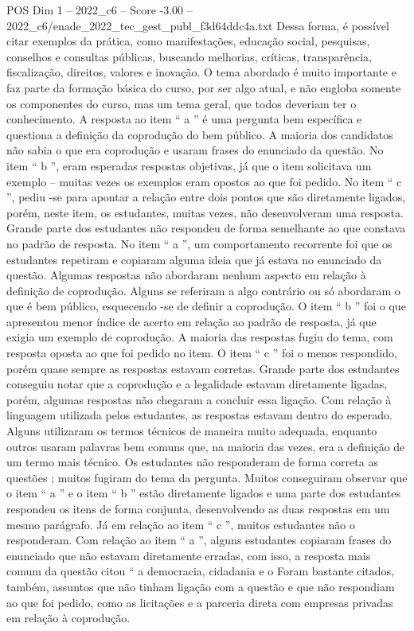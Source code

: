 \begin{textsample}{POS Dim 1 – 2022\_c6 – Score -3.00 – 2022\_c6/enade\_2022\_tec\_gest\_publ\_f3d64ddc4a.txt}
Dessa forma, é possível citar exemplos da prática, como manifestações, educação social, pesquisas, conselhos e consultas públicas, buscando melhorias, críticas, transparência, fiscalização, direitos, valores e inovação.
O tema abordado é muito importante e faz parte da formação básica do curso, por ser algo atual, e não engloba somente os componentes do curso, mas um tema geral, que todos deveriam ter o conhecimento.
A resposta ao item “ a ” é uma pergunta bem específica e questiona a definição da coprodução do bem público.
A maioria dos candidatos não sabia o que era coprodução e usaram frases do enunciado da questão.
No item “ b ”, eram esperadas respostas objetivas, já que o item solicitava um exemplo – muitas vezes os exemplos eram opostos ao que foi pedido.
No item “ c ”, pediu -se para apontar a relação entre dois pontos que são diretamente ligados, porém, neste item, os estudantes, muitas vezes, não desenvolveram uma resposta.
Grande parte dos estudantes não respondeu de forma semelhante ao que constava no padrão de resposta.
No item “ a ”, um comportamento recorrente foi que os estudantes repetiram e copiaram alguma ideia que já estava no enunciado da questão.
Algumas respostas não abordaram nenhum aspecto em relação à definição de coprodução.
Alguns se referiram a algo contrário ou só abordaram o que é bem público, esquecendo -se de definir a coprodução.
O item “ b ” foi o que apresentou menor índice de acerto em relação ao padrão de resposta, já que exigia um exemplo de coprodução.
A maioria das respostas fugiu do tema, com resposta oposta ao que foi pedido no item.
O item “ c ” foi o menos respondido, porém quase sempre as respostas estavam corretas.
Grande parte dos estudantes conseguiu notar que a coprodução e a legalidade estavam diretamente ligadas, porém, algumas respostas não chegaram a concluir essa ligação.
Com relação à linguagem utilizada pelos estudantes, as respostas estavam dentro do esperado.
Alguns utilizaram os termos técnicos de maneira muito adequada, enquanto outros usaram palavras bem comuns que, na maioria das vezes, era a definição de um termo mais técnico.
Os estudantes não responderam de forma correta as questões ; muitos fugiram do tema da pergunta.
Muitos conseguiram observar que o item “ a ” e o item “ b ” estão diretamente ligados e uma parte dos estudantes respondeu os itens de forma conjunta, desenvolvendo as duas respostas em um mesmo parágrafo.
Já em relação ao item “ c ”, muitos estudantes não o responderam.
Com relação ao item “ a ”, alguns estudantes copiaram frases do enunciado que não estavam diretamente erradas, com isso, a resposta mais comum da questão citou “ a democracia, cidadania e o Foram bastante citados, também, assuntos que não tinham ligação com a questão e que não respondiam ao que foi pedido, como as licitações e a parceria direta com empresas privadas em relação à coprodução.

\end{textsample}
